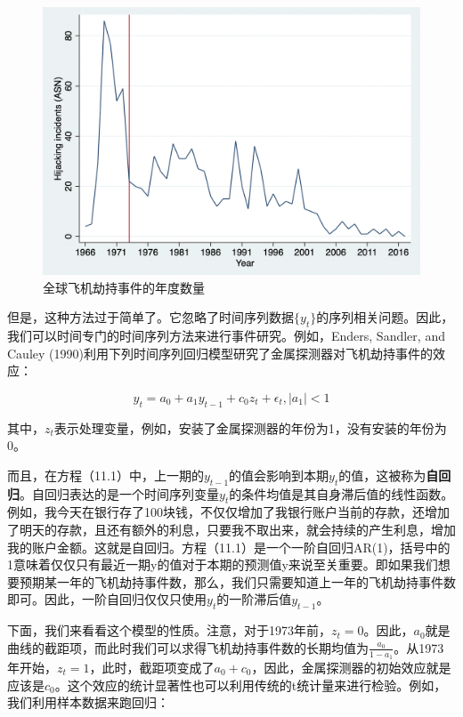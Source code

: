 \documentclass[cn,12pt,math=newtx,citestyle=gb7714-2015,bibstyle=gb7714-2015]{elegantbook}
\begin{document}
	\begin{figure}[tbph]
		\centering
		\includegraphics[width=1\linewidth, height=0.5\textheight]{hijacking}
		\caption{全球飞机劫持事件的年度数量}
		\label{fig:hijacking}
	\end{figure}
	
	但是，这种方法过于简单了。它忽略了时间序列数据$\{y_t\}$的序列相关问题。因此，我们可以时间专门的时间序列方法来进行事件研究。例如，Enders, Sandler, and Cauley (1990)利用下列时间序列回归模型研究了金属探测器对飞机劫持事件的效应：
	
	\begin{equation}
		y_t = a_0 +a_1 y_{t-1} +c_0 z_t +\epsilon_t, |a_1|<1
	\end{equation}
	
	其中，$z_t$表示处理变量，例如，安装了金属探测器的年份为1，没有安装的年份为0。
	
	而且，在方程（11.1）中，上一期的$y_{t-1}$的值会影响到本期$y_t$的值，这被称为\textbf{自回归}。自回归表达的是一个时间序列变量$y_t$的条件均值是其自身滞后值的线性函数。例如，我今天在银行存了100块钱，不仅仅增加了我银行账户当前的存款，还增加了明天的存款，且还有额外的利息，只要我不取出来，就会持续的产生利息，增加我的账户金额。这就是自回归。方程（11.1）是一个一阶自回归AR(1)，括号中的1意味着仅仅只有最近一期y的值对于本期的预测值y来说至关重要。即如果我们想要预期某一年的飞机劫持事件数，那么，我们只需要知道上一年的飞机劫持事件数即可。因此，一阶自回归仅仅只使用$y_t$的一阶滞后值$y_{t-1}$。
	
	下面，我们来看看这个模型的性质。注意，对于1973年前，$z_t=0$。因此，$a_0$就是曲线的截距项，而此时我们可以求得飞机劫持事件数的长期均值为$\frac{a_0}{1-a_1}$。从1973年开始，$z_t=1$，此时，截距项变成了$a_0+c_0$，因此，金属探测器的初始效应就是应该是$c_0$。这个效应的统计显著性也可以利用传统的t统计量来进行检验。例如，我们利用样本数据来跑回归：
	
\end{document}
